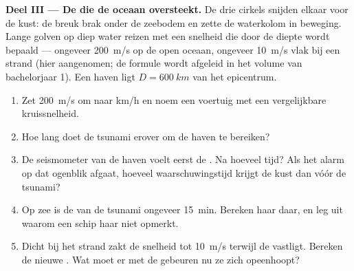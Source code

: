\begin{problem}
\medskip
\noindent\textbf{Deel III --- De  die de oceaan oversteekt.}
De drie cirkels snijden elkaar voor de kust: de breuk brak onder de
zeebodem en zette de waterkolom in beweging. Lange golven op diep water
reizen met een snelheid die door de diepte wordt bepaald --- ongeveer
\qty{200}{m/s} op de open oceaan, ongeveer \qty{10}{m/s} vlak bij een
strand (hier aangenomen; de formule wordt afgeleid in het volume van
bachelorjaar 1). Een haven ligt $D = \qty{600}{km}$ van het epicentrum.
\begin{enumerate}[resume]
  \item Zet \qty{200}{m/s} om naar \unit{km/h} en noem een voertuig met
        een vergelijkbare kruissnelheid.
  \item Hoe lang doet de tsunami erover om de haven te bereiken?
  \item De seismometer van de haven voelt eerst de . Na hoeveel
        tijd? Als het alarm op dat ogenblik afgaat, hoeveel
        waarschuwingstijd krijgt de kust dan vóór de tsunami?
  \item Op zee is de  van de tsunami ongeveer \qty{15}{min}.
        Bereken haar  daar, en leg uit waarom een schip haar
        niet opmerkt.
  \item Dicht bij het strand zakt de snelheid tot \qty{10}{m/s} terwijl
        de  vastligt. Bereken de nieuwe . Wat moet er met
        de  gebeuren nu ze zich opeenhoopt?
\end{enumerate}


\end{problem}
